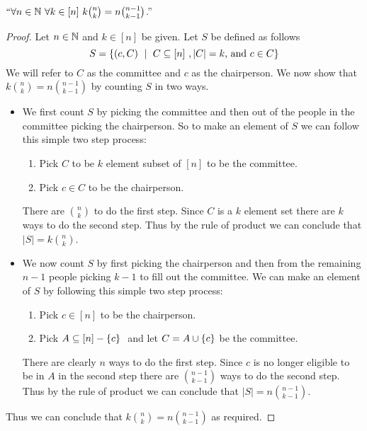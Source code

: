         \begin{theorem}
            $``\forall n \in \mathbb{N} \ \forall k \in [n] \ k \binom{n}{k} = n \binom{n - 1}{k - 1}$.''
        \end{theorem}
        \begin{proof}
            Let $n \in \mathbb{N}$ and $k \in [n]$ be given. Let $S$ be defined as follows
            \begin{equation}
                S = \Set{(c, C) \ \mid \ \subs{C}{[n]}, |C| = k \mbox{, and } c \in C}
            \end{equation}
            We will refer to $C$ as the committee and $c$ as the chairperson.
            We now show that $k \binom{n}{k} = n \binom{n - 1}{k - 1}$ by counting $S$ in
            two ways.
            \begin{itemize}
                \item
                    We first count $S$ by picking the committee and then out of the people
                    in the committee picking the chairperson. So to make an element of $S$
                    we can follow this simple two step process:
                    \begin{enumerate}
                        \item
                            Pick $C$ to be $k$ element subset of $[n]$ to be the committee.
                        \item
                            Pick $c \in C$ to be the chairperson.
                    \end{enumerate}
                    There are $\binom{n}{k}$ to do the first step. Since $C$ is a $k$
                    element set there are $k$ ways to do the second step. Thus by the
                    rule of product we can conclude that $|S| = k \binom{n}{k}$.
                \item
                    We now count $S$ by first picking the chairperson and then from the
                    remaining $n - 1$ people picking $k - 1$ to fill out the committee.
                    We can make an element of $S$ by following this simple two step process:
                    \begin{enumerate}
                        \item
                            Pick $c \in [n]$ to be the chairperson.
                        \item
                            Pick $A \subseteq [n] - \left\{c\right\} \ $ and let $C = A \cup \left\{c\right\}$
                            be the committee.
                    \end{enumerate}
                        There are clearly $n$ ways to do the first step. Since $c$ is no
                        longer eligible to be in $A$ in the second step there are $\binom{n - 1}{k - 1}$
                        ways to do the second step. Thus by the rule of product we can conclude
                        that $|S| = n \binom{n - 1}{k - 1}$.
            \end{itemize}
            Thus we can conclude that $k \binom{n}{k} = n \binom{n - 1}{k - 1}$
            as required. \QED
        \end{proof}
